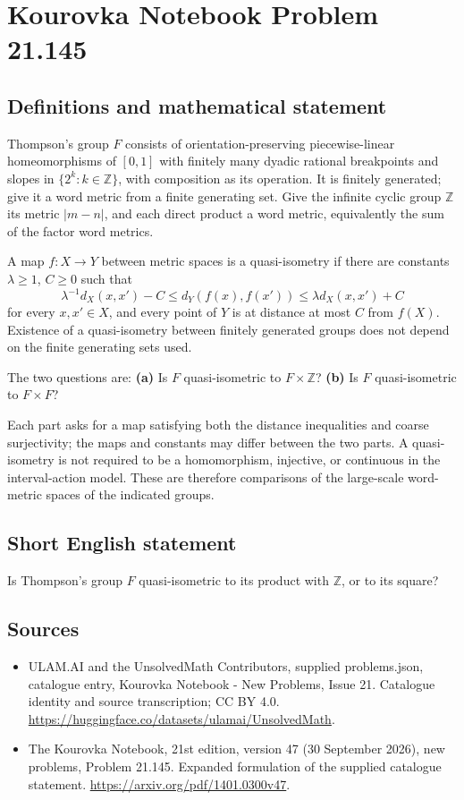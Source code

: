 \documentclass[11pt,a4paper]{article}
\begin{document}
\section*{Kourovka Notebook Problem 21.145}\label{statement}

\subsection{Definitions and mathematical statement}
Thompson's group $F$ consists of orientation-preserving piecewise-linear homeomorphisms of $[0,1]$ with finitely many dyadic rational breakpoints and slopes in $\{2^k:k\in\mathbb Z\}$, with composition as its operation. It is finitely generated; give it a word metric from a finite generating set. Give the infinite cyclic group $\mathbb Z$ its metric $|m-n|$, and each direct product a word metric, equivalently the sum of the factor word metrics.

A map $f:X\to Y$ between metric spaces is a quasi-isometry if there are constants $\lambda\ge1$, $C\ge0$ such that
\[
 \lambda^{-1}d_X(x,x')-C\le d_Y(f(x),f(x'))
 \le\lambda d_X(x,x')+C
\]
for every $x,x'\in X$, and every point of $Y$ is at distance at most $C$ from $f(X)$. Existence of a quasi-isometry between finitely generated groups does not depend on the finite generating sets used.

The two questions are:
\textbf{(a)} Is $F$ quasi-isometric to $F\times\mathbb Z$?
\textbf{(b)} Is $F$ quasi-isometric to $F\times F$?

Each part asks for a map satisfying both the distance inequalities and coarse surjectivity; the maps and constants may differ between the two parts. A quasi-isometry is not required to be a homomorphism, injective, or continuous in the interval-action model. These are therefore comparisons of the large-scale word-metric spaces of the indicated groups.
\subsection{Short English statement}
Is Thompson’s group $F$ quasi-isometric to its product with $\mathbb Z$, or to its square?
\subsection{Sources}
\begin{itemize}
\item[S1] ULAM.AI and the UnsolvedMath Contributors, supplied problems.json, catalogue entry, Kourovka Notebook - New Problems, Issue 21. Catalogue identity and source transcription; CC BY 4.0.
\url{https://huggingface.co/datasets/ulamai/UnsolvedMath}.
\item[S2] The Kourovka Notebook, 21st edition, version 47 (30 September 2026), new problems, Problem 21.145. Expanded formulation of the supplied catalogue statement.
\url{https://arxiv.org/pdf/1401.0300v47}.
\end{itemize}
\end{document}
